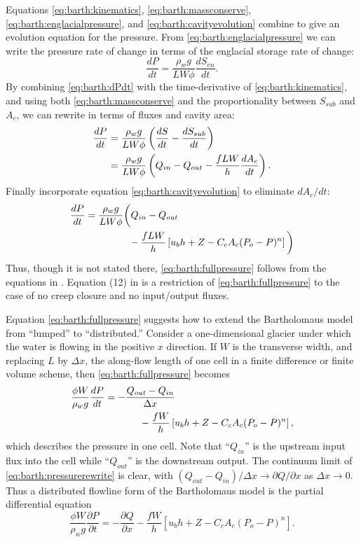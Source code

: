 \documentclass[review,letterpaper]{igs}
\begin{document}
Equations \eqref{eq:barth:kinematics}, \eqref{eq:barth:massconserve}, \eqref{eq:barth:englacialpressure}, and \eqref{eq:barth:cavityevolution} combine to give an evolution equation for the pressure.  From \eqref{eq:barth:englacialpressure} we can write the pressure rate of change in terms of the englacial storage rate of change:
\begin{equation}
\frac{dP}{dt} = \frac{\rho_w g}{L W \phi} \frac{d S_{en}}{dt}. \label{eq:barth:dPdt}
\end{equation}
By combining \eqref{eq:barth:dPdt} with  the time-derivative of \eqref{eq:barth:kinematics}, and using both \eqref{eq:barth:massconserve} and the proportionality between $S_{sub}$ and $A_c$, we can rewrite in terms of fluxes and cavity area:
\begin{align}
\frac{dP}{dt} &= \frac{\rho_w g}{L W \phi} \left(\frac{d S}{dt} - \frac{d S_{sub}}{dt}\right) \\
&= \frac{\rho_w g}{L W \phi} \left(Q_{in} - Q_{out} - \frac{f L W}{h} \frac{d A_c}{dt}\right). \notag
\end{align}
Finally incorporate equation \eqref{eq:barth:cavityevolution} to eliminate $dA_c/dt$:
\begin{align}
&\frac{dP}{dt} = \frac{\rho_w g}{L W \phi} \bigg(Q_{in} - Q_{out} \label{eq:barth:fullpressure} \\
&\qquad \qquad \qquad - \frac{f L W}{h} \left[u_b h + Z - C_c A_c (P_o-P)^n\right]\bigg) \notag
\end{align}
Thus, though it is not stated there, \eqref{eq:barth:fullpressure} follows from the equations in \cite{Bartholomausetal2011}.  Equation (12) in \cite{Bartholomausetal2011} is a restriction of \eqref{eq:barth:fullpressure} to the case of no creep closure and no input/output fluxes.

Equation \eqref{eq:barth:fullpressure} suggests how to extend the Bartholomaus model from ``lumped'' to ``distributed.''  Consider a one-dimensional glacier under which the water is flowing in the positive $x$ direction.  If $W$ is the transverse width, and replacing $L$ by $\Delta x$, the along-flow length of one cell in a finite difference or finite volume scheme, then \eqref{eq:barth:fullpressure} becomes
\begin{align}
&\frac{\phi W}{\rho_w g}\frac{dP}{dt} = - \frac{Q_{out} - Q_{in}}{\Delta x}  \label{eq:barth:pressurerewrite} \\
&\qquad \qquad \qquad \quad - \frac{f W}{h} \left[u_b h + Z - C_c A_c (P_o-P)^n\right], \notag
\end{align}
which describes the pressure in one cell.  Note that ``$Q_{in}$'' is the upstream input flux into the cell while ``$Q_{out}$'' is the downstream output.  The continuum limit of \eqref{eq:barth:pressurerewrite} is clear, with $(Q_{out} - Q_{in})/\Delta x \to \partial Q/\partial x$ as $\Delta x \to 0$.  Thus a distributed flowline form of the Bartholomaus model is the partial differential equation
\begin{equation}
\frac{\phi W}{\rho_w g} \frac{\partial P}{\partial t} = - \frac{\partial Q}{\partial x} - \frac{f W}{h} \left[u_b h + Z - C_c A_c (P_o-P)^n\right]. \label{eq:barth:distpressure}
\end{equation}
\end{document}
